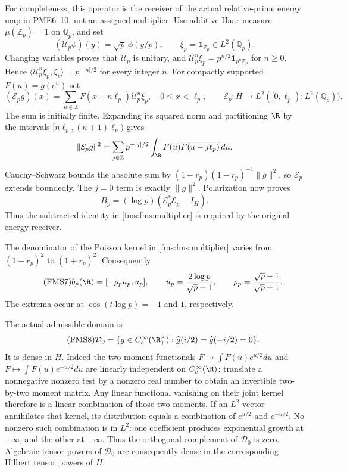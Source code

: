 \documentclass[11pt,a4paper]{article}
\theoremstyle{definition}\newtheorem{definition}[theorem]{Definition}
\newcommand{\Z}{\mathbb Z}\newcommand{\Q}{\mathbb Q}
\begin{document}
For completeness, this operator is the receiver of the actual
relative-prime energy map in PME6--10, not an assigned multiplier.
Use additive Haar measure $\mu(\Z_p)=1$ on $\Q_p$, and set
\[
 (\mathscr U_p\phi)(y)=\sqrt p\,\phi(y/p),\qquad
 \xi_p=\mathbf1_{\Z_p}\in L^2(\Q_p).
\]
Changing variables proves that $\mathscr U_p$ is unitary, and
$\mathscr U_p^n\xi_p=p^{n/2}\mathbf1_{p^n\Z_p}$ for $n\ge0$.
Hence $\langle\mathscr U_p^n\xi_p,\xi_p\rangle=p^{-|n|/2}$ for
every integer $n$.  For compactly supported $F(u)=g(e^u)$ set
\begin{equation}\tag{FMS5}\label{fms:fms:energy}
 (\mathcal E_pg)(x)=\sum_{n\in\Z}F(x+n\ell_p)\mathscr U_p^n\xi_p,
 \quad 0\le x<\ell_p,\qquad
 \mathcal E_p:H\longrightarrow
 L^2([0,\ell_p);L^2(\Q_p)).
\end{equation}
The sum is initially finite. Expanding its squared norm and
partitioning $\R$ by the intervals $[n\ell_p,(n+1)\ell_p)$ gives
\[
 \|\mathcal E_pg\|^2
 =\sum_{j\in\Z}p^{-|j|/2}
       \int_\R F(u)\overline{F(u-j\ell_p)}\,du.
\]
Cauchy--Schwarz bounds the absolute sum by
$(1+r_p)(1-r_p)^{-1}\|g\|^2$, so $\mathcal E_p$ extends boundedly.
The $j=0$ term is exactly $\|g\|^2$. Polarization now proves
\begin{equation}\tag{FMS6}\label{fms:fms:energyreceiver}
 B_p=(\log p)(\mathcal E_p^*\mathcal E_p-I_H).
\end{equation}
Thus the subtracted identity in \eqref{fms:fms:multiplier} is required by
the original energy receiver.

The denominator of the Poisson kernel in \eqref{fms:fms:multiplier}
varies from $(1-r_p)^2$ to $(1+r_p)^2$.  Consequently
\begin{equation}\tag{FMS7}\label{fms:fms:localrange}
 b_p(\R)=[-\rho_pu_p,u_p],\qquad
 u_p=\frac{2\log p}{\sqrt p-1},\qquad
 \rho_p=\frac{\sqrt p-1}{\sqrt p+1}.
\end{equation}
The extrema occur at $\cos(t\log p)=-1$ and $1$, respectively.

The actual admissible domain is
\begin{equation}\tag{FMS8}\label{fms:fms:domain}
 \mathcal D_0=\{g\in C_c^\infty(\R_+^\times):
                  \widehat g(i/2)=\widehat g(-i/2)=0\}.
\end{equation}
It is dense in $H$.  Indeed the two moment functionals
$F\mapsto\int F(u)e^{u/2}du$ and
$F\mapsto\int F(u)e^{-u/2}du$ are linearly independent on
$C_c^\infty(\R)$: translate a nonnegative nonzero test by a nonzero
real number to obtain an invertible two-by-two moment matrix.
Any linear functional vanishing on their joint kernel therefore is
a linear combination of those two moments.  If an $L^2$ vector
annihilates that kernel, its distribution equals a combination of
$e^{u/2}$ and $e^{-u/2}$.  No nonzero such combination is in $L^2$:
one coefficient produces exponential growth at $+\infty$, and the
other at $-\infty$.  Thus the orthogonal complement of $\mathcal D_0$
is zero.  Algebraic tensor powers of $\mathcal D_0$ are consequently
dense in the corresponding Hilbert tensor powers of $H$.
\end{document}
